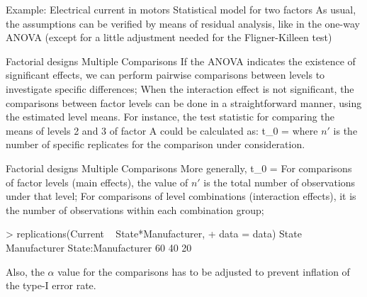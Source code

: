 \documentclass[t]{beamer}
\begin{document}

\begin{ftstf}
{Example: Electrical current in motors}
{Statistical model for two factors}
As usual, the assumptions can be verified by means of residual analysis, like in the one-way ANOVA (except for a little adjustment needed for the Fligner-Killeen test)
\vhalf
{}
\end{ftstf}


\begin{ftst}
{Factorial designs}
{Multiple Comparisons}
If the ANOVA indicates the existence of significant effects, we can perform pairwise comparisons between levels to investigate specific differences;
\vhalf
When the interaction effect is not significant, the comparisons between factor levels can be done in a straightforward manner, using the estimated level means. For instance, the test statistic for comparing the means of levels 2 and 3 of factor A could be calculated as:
\beqs
t_0 = 
\eqs
\vhalf
\noindent where $n'$ is the number of specific replicates for the comparison under consideration.
\end{ftst}


\begin{ftstf}
{Factorial designs}
{Multiple Comparisons}
More generally,
\beqs
t_0 = 
\eqs
\vhalf
For comparisons of factor levels (main effects), the value of $n'$ is the total number of observations under that level;
\vhalf
For comparisons of level combinations (interaction effects), it is the number of observations within each combination group;
\vhalf
\begin{rcode}
> replications(Current ~ State*Manufacturer,
+              data = data)
             State       Manufacturer State:Manufacturer 
                60                 40                 20 
\end{rcode}
\vhalf
Also, the $\alpha$ value for the comparisons has to be adjusted to prevent inflation of the type-I error rate.
\end{ftstf}
\end{document}
